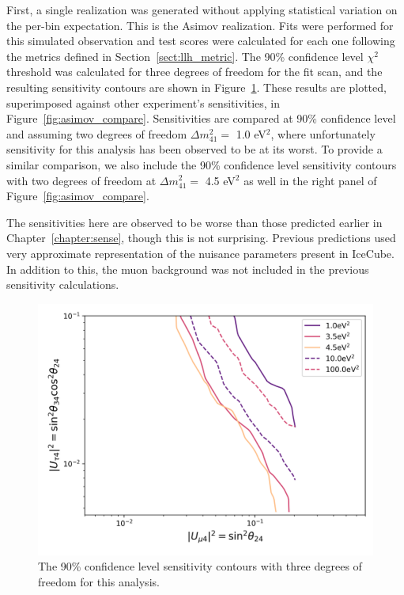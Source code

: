 \documentclass[main.tex]{subfiles}
\begin{document}
First, a single realization was generated without applying statistical variation on the per-bin expectation. 
This is the Asimov realization. 
Fits were performed for this simulated observation and test scores were calculated for each one following the metrics defined in Section~\ref{sect:llh_metric}.
The 90\% confidence level $\chi^{2}$ threshold was calculated for three degrees of freedom for the fit scan, and the resulting sensitivity contours are shown in Figure~\ref{fig:asimov_sense}. 
These results are plotted, superimposed against other experiment's sensitivities, in Figure~\ref{fig:asimov_compare}. 
Sensitivities are compared at 90\% confidence level and assuming two degrees of freedom $\Delta m_{41}^{2}=$ 1.0 eV$^{2}$, where unfortunately sensitivity for this analysis has been observed to be at its worst. 
To provide a similar comparison, we also include the 90\% confidence level sensitivity contours with two degrees of freedom at $\Delta m_{41}^{2}=$ 4.5 eV$^{2}$ as well in the right panel of Figure~\ref{fig:asimov_compare}.

The sensitivities here are observed to be worse than those predicted earlier in Chapter~\ref{chapter:sense}, though this is not surprising. 
Previous predictions used very approximate representation of the nuisance parameters present in IceCube. 
In addition to this, the muon background was not included in the previous sensitivity calculations.

\begin{figure}
    \centering
    \includegraphics[width=0.7\linewidth]{figures/cascade_mcllheff_final_Realization_Asimov_sterile_0_cl0.9_dof3.png}
    \caption{The 90\% confidence level sensitivity contours with three degrees of freedom for this analysis.}\label{fig:asimov_sense}
\end{figure}
\end{document}
